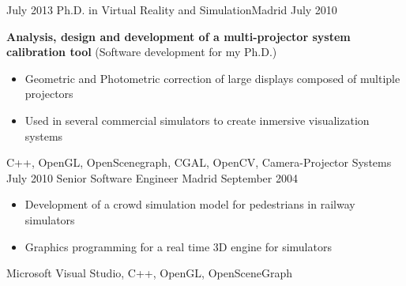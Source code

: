 \begin{experiences}
  \emptySeparator
  \experience
    {July 2013} {Ph.D. in Virtual Reality and Simulation}{}{Madrid}
    {July 2010}    {
                      \textbf{Analysis, design and development of a multi-projector system calibration tool} (Software development for my Ph.D.)
                      \begin{itemize}
                        \item Geometric and Photometric correction of large displays composed of multiple projectors
                        \item Used in several commercial simulators to create inmersive visualization systems 
                      \end{itemize}
                    }
                    {C++, OpenGL, OpenScenegraph, CGAL, OpenCV, Camera-Projector Systems}
  \emptySeparator
  \experience
    {July 2010} {Senior Software Engineer }{}{Madrid}
    {September 2004}    {
                      \begin{itemize}
                        \item Development of a crowd simulation model for pedestrians in railway simulators
                        \item Graphics programming for a real time 3D engine for simulators                                                      
                      \end{itemize}
                    }
                    {Microsoft Visual Studio, C++, OpenGL, OpenSceneGraph}
\end{experiences}
